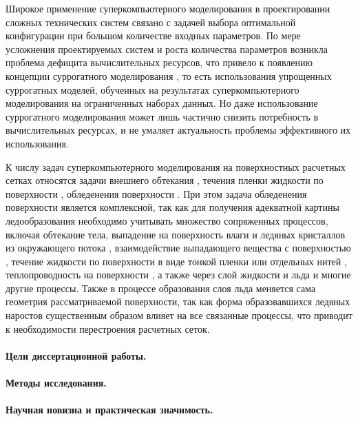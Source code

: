 \documentclass[a4paper,14pt]{extarticle}                     %
\numberwithin{equation}{section}                             %
\numberwithin{figure}{section}                               %
\numberwithin{table}{section}                                %
\theoremstyle{plain}                                         %
\numberwithin{theorem}{section}                              %
\numberwithin{lemma}{section}                                %
\numberwithin{definition}{section}                           %
\begin{document}
Широкое применение суперкомпьютерного моделирования в проектировании сложных технических систем связано с задачей выбора оптимальной конфигурации при большом количестве входных параметров.
По мере усложнения проектируемых систем и роста количества параметров возникла проблема дефицита вычислительных ресурсов, что привело к появлению концепции суррогатного моделирования \cite{Jiang2020Surrogate,Barcenas2023Surrogate,Catalani2024Surrogate}, то есть использования упрощенных суррогатных моделей, обученных на результатах суперкомпьютерного моделирования на ограниченных наборах данных.
Но даже использование суррогатного моделирования может лишь частично снизить потребность в вычислительных ресурсах, и не умаляет актуальность проблемы эффективного их использования.

К числу задач суперкомпьютерного моделирования на поверхностных расчетных сетках относятся задачи внешнего обтекания \cite{Mitin2020Flow}, течения пленки жидкости по поверхности \cite{Li2014Film}, обледенения поверхности \cite{Koshelev2020Ice,Sorokin2020Ice}.
При этом задача обледенения поверхности является комплексной, так как для получения адекватной картины ледообразования необходимо учитывать множество сопряженных процессов, включая обтекание тела, выпадение на поверхность влаги и ледяных кристаллов из окружающего потока \cite{Cui2023Impingement}, взаимодействие выпадающего вещества с поверхностью \cite{Cui2021Impingement}, течение жидкости по поверхности в виде тонкой пленки или отдельных нитей \cite{Alexeenko2013Ice}, теплопроводность на поверхности \cite{Domingos2015IceHeat}, а также через слой жидкости и льда \cite{Xin2013Ice} и многие другие процессы.
Также в процессе образования слоя льда меняется сама геометрия рассматриваемой поверхности, так как форма образовавшихся ледяных наростов существенным образом влияет на все связанные процессы, что приводит к необходимости перестроения расчетных сеток.

\paragraph{Цели диссертационной работы.}

\paragraph{Методы исследования.}

\paragraph{Научная новизна и практическая значимость.}
\end{document}
